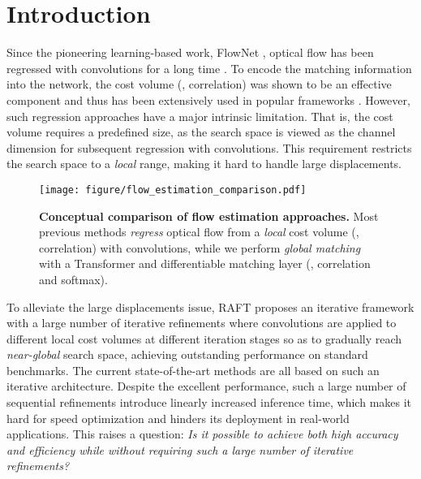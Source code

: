 \documentclass[10pt,twocolumn,letterpaper]{article}
\begin{document}
\section{Introduction}
\label{sec:intro}
Since the pioneering learning-based work, FlowNet \cite{dosovitskiy2015flownet}, optical flow has been regressed with convolutions for a long time \cite{ilg2017flownet,ranjan2017optical,sun2018pwc,hur2019iterative,teed2020raft,xu2021high,Jiang_2021_ICCV,Zhang_2021_ICCV}. To encode the matching information into the network, the cost volume (\ie, correlation) \cite{hosni2012fast} was shown to be an effective component and thus has been extensively used in popular frameworks \cite{ilg2017flownet,sun2018pwc,teed2020raft}. However, such regression approaches have a major intrinsic limitation. That is, the cost volume requires a predefined size, as the search space is viewed as the channel dimension for subsequent regression with convolutions. This requirement restricts the search space to a \emph{local} range, making it hard to handle large displacements.




\begin{figure}[t]
    \centering
    \texttt{[image: figure/flow\_estimation\_comparison.pdf]}
    \vspace{-6pt}
    \caption{\textbf{Conceptual comparison of flow estimation approaches.} Most previous methods \emph{regress} optical flow from a \emph{local} cost volume (\ie, correlation) with convolutions, while we perform \emph{global matching} with a Transformer and differentiable matching layer (\ie, correlation and softmax).}
    \label{fig:flow_reg}
    \vspace{-12pt}
\end{figure}


To alleviate the large displacements issue, RAFT \cite{teed2020raft} proposes
an iterative framework with a large number of iterative refinements where convolutions are applied to different local cost volumes at different iteration stages so as to gradually reach \textit{near-global} search space, achieving outstanding performance on standard benchmarks. The current state-of-the-art methods \cite{Jiang_2021_ICCV, xu2021high, Zhang_2021_ICCV, teed2020raft} are all based on such an iterative architecture. Despite the excellent performance, such a large number of sequential refinements introduce linearly increased inference time, which makes it hard for speed optimization and hinders its deployment in real-world applications. 
This raises a question: \textit{Is it possible to achieve both high accuracy and efficiency while without requiring such a large number of iterative refinements?}
\end{document}
